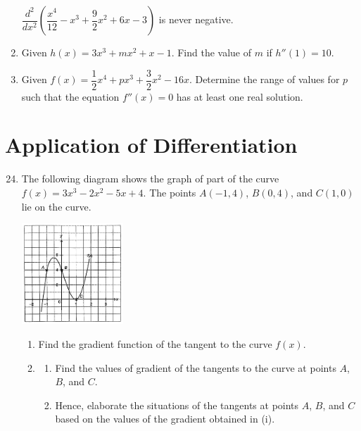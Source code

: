 \documentclass{report}
\begin{document}
\begin{multicols*}{2}
\begin{enumerate}
              $\dfrac{d^2}{dx^2}\left(\dfrac{x^4}{12} -
                  x^3 + \dfrac{9}{2}x^2 + 6x - 3\right)$ is never negative.
        \item Given $h(x) = 3x^3 + mx^2 + x - 1$. Find the value of $m$ if $h''(1) = 10$.
        \item Given $f(x) = \dfrac{1}{2}x^4 + px^3 + \dfrac{3}{2}x^2 - 16x$. Determine the
              range of values for $p$ such that the equation $f''(x) = 0$ has at least one
              real solution.
    \end{enumerate}
    \section{Application of Differentiation}
    \begin{enumerate}
        \setcounter{enumi}{23}
        \item The following diagram shows the graph of part of the curve $f(x) = 3x^3 -2x^2 -
                  5x + 4$. The points $A(-1, 4)$, $B(0, 4)$, and $C(1, 0)$ lie on the curve.
              \begin{center}
                  \includegraphics[width=0.3\textwidth]{./images/q24.jpeg}
              \end{center}
              \begin{enumerate}
                  \item Find the gradient function of the tangent to the curve $f(x)$.
                  \item \begin{enumerate}
                            \item Find the values of gradient of the tangents to the curve at points $A$, $B$,
                                  and $C$.
                            \item Hence, elaborate the situations of the tangents at points $A$, $B$, and $C$
                                  based on the values of the gradient obtained in (i).
                        \end{enumerate}
              \end{enumerate}

\end{enumerate}
\end{multicols*}
\end{document}
